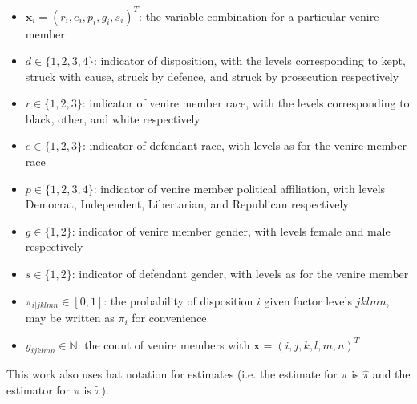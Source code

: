 \begin{itemize}
\item $\mathbf{x}_i = (r_i,e_i,p_i,g_i,s_i)^T$: the variable combination for a particular venire member
\item $d \in \{1,2,3,4\}$: indicator of disposition, with the levels corresponding to kept, struck with
  cause, struck by defence, and struck by prosecution respectively
\item $r \in \{1,2,3\}$: indicator of venire member race, with the levels corresponding to black, other, and
  white respectively
\item $e \in \{1,2,3\}$: indicator of defendant race, with levels as for the venire member race
\item $p \in \{1,2,3,4\}$: indicator of venire member political affiliation, with levels Democrat,
  Independent, Libertarian, and Republican respectively
\item $g \in \{1,2\}$: indicator of venire member gender, with levels female and male respectively
\item $s \in \{1,2\}$: indicator of defendant gender, with levels as for the venire member
\item $\pi_{i|jklmn} \in [0,1]$: the probability of disposition $i$ given factor levels $jklmn$, may be written as $\pi_i$ for
  convenience
\item $y_{ijklmn} \in \mathbb{N}$: the count of venire members with $\textbf{x} = (i,j,k,l,m,n)^T$
\end{itemize}

This work also uses hat notation for estimates (i.e. the estimate for $\pi$ is $\hat{\pi}$ and the estimator for $\pi$ is
$\tilde{\pi}$).

